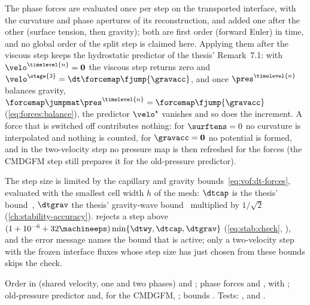 The phase forces are evaluated once per step on the transported interface,
with the curvature and phase apertures of its reconstruction, and added one
after the other (surface tension, then gravity); both are first order
(forward Euler) in time, and no global order of the split step is claimed
here. Applying them after the viscous step keeps the hydrostatic predictor
of the thesis' Remark~7.1: with $\velo^{\timelevel{n}}=\mathbf{0}$ the viscous
step returns zero and $\velo^{\stage{3}}=\dt\forcemap\fjump{\gravacc}$, and
once $\pres^{\timelevel{n}}$ balances gravity,
$\forcemap\jumpmat\pres^{\timelevel{n}}=\forcemap\fjump{\gravacc}$
(\cref{eq:forces:balance}), the predictor $\velo^{\star}$ vanishes and so
does the increment. A force that is switched off contributes nothing: for
$\surftens=0$ no curvature is interpolated and nothing is counted, for
$\gravacc=\mathbf{0}$ no potential is formed, and in the two-velocity step
no pressure map is then refreshed for the forces (the CMDGFM step still
prepares it for the old-pressure predictor).

The step size is limited by the capillary and gravity
bounds~\cref{eq:vof:dt-forces}, evaluated with the smallest cell width $h$
of the mesh: $\dtcap$ is the thesis'
bound~, $\dtgrav$ the thesis' gravity-wave
bound~ multiplied by $1/\sqrt2$
(\cref{ch:stability-accuracy}).  rejects a step above
$(1+10^{-6}+32\machineeps)\min\{\dtwy,\dtcap,\dtgrav\}$ (\cref{eq:stab:check}, ), and the error message
names the bound that is active; only a two-velocity step with the frozen
interface fluxes whose step size  has just chosen from these
bounds skips the check.

\begin{implnote}
Order in  (shared velocity,
one and two phases) and ;
phase forces 
and ,
with ;
old-pressure predictor 
and, for the CMDGFM, ;
bounds .
Tests: ,
and .
\end{implnote}

